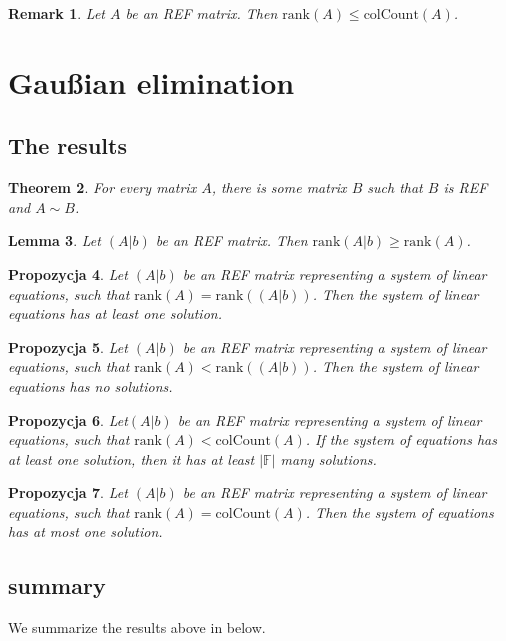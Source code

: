 \documentclass{article}
\newcommand{\rank}[1]{\text{rank}(#1)}
\newcommand{\colctn}[1]{\text{colCount}(#1)}
\newcommand{\Ab}{(A|b)}
\newtheorem{lemma}{Lemma}[subsection]
\newtheorem{remark}[lemma]{Remark}
\newtheorem{thm}[lemma]{Theorem}
\newtheorem{proposition}[lemma]{Propozycja}
\theoremstyle{definition}
\begin{document}
\begin{remark}\label{rem:0:0:6}
Let $A$ be an REF matrix. Then $\rank{A}\leq\colctn{A}$.
\end{remark}

\section{Gaußian elimination}
\subsection{The results}
\begin{thm}
For every matrix $A$, there is some matrix $B$ such that $B$ is REF and $A\sim B$.
\end{thm}

\begin{lemma}\label{lemma:1:1:2}
Let $(A|b)$ be an REF matrix. Then $\rank{A|b}\geq\rank{A}$.
\end{lemma}

\begin{proposition}\label{proposition:1:1:3}
Let $(A|b)$ be an REF matrix representing a system of linear equations, such that $\rank{A}=\rank{\Ab}$. Then the system of linear equations has at least one solution.
\end{proposition}

\begin{proposition}\label{proposition:1:1:4}
Let $\Ab$ be an REF matrix representing a system of linear equations, such that $\rank{A}<\rank{\Ab}$. Then the system of linear equations has no solutions.
\end{proposition}

\begin{proposition}\label{proposition:1:1:5}
Let$\Ab$ be an REF matrix representing a system of linear equations, such that $\rank{A}<\colctn{A}$. If the system of equations has at least one solution, then it has at least $|\mathbb{F}|$ many solutions.
\end{proposition}

\begin{proposition}\label{proposition:1:1:6}
Let $\Ab$ be an REF matrix representing a system of linear equations, such that $\rank{A}=\colctn{A}$. Then the system of equations has at most one solution.
\end{proposition}

\subsection{summary}\label{summ}
We summarize the results above in  below.
\end{document}

